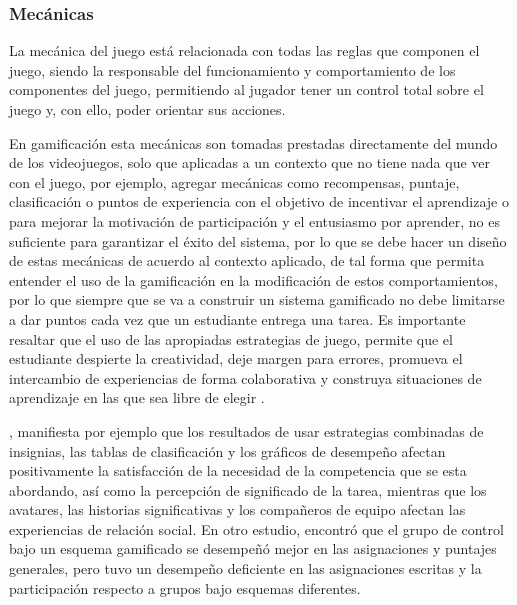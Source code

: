 \subsubsection{Mecánicas \label{sec:mecanicas}}

La mecánica del juego está relacionada con todas las reglas que componen el juego, siendo la responsable del
funcionamiento y comportamiento de los componentes del juego, permitiendo al jugador tener un control total 
sobre el juego y, con ello, poder orientar sus acciones.

En gamificación esta mecánicas son tomadas prestadas directamente del mundo de los videojuegos, solo que
aplicadas a un contexto que no tiene nada que ver con el juego, por ejemplo, agregar mecánicas como 
recompensas, puntaje, clasificación o puntos de experiencia con el objetivo de incentivar el aprendizaje o 
para mejorar la motivación de participación y el entusiasmo por aprender, no es suficiente para garantizar
el éxito del sistema, por lo que se debe hacer un diseño de estas mecánicas de acuerdo al contexto aplicado,
de tal forma que permita entender el uso de la gamificación en la modificación de estos comportamientos, por 
lo que siempre que se va a construir un sistema gamificado no debe limitarse a dar puntos cada vez que un
estudiante entrega una tarea. Es importante resaltar que el uso de las apropiadas estrategias de juego, 
permite que el estudiante despierte la creatividad, deje margen para errores, promueva el intercambio de 
experiencias de forma colaborativa y construya situaciones de aprendizaje en las que sea libre de elegir
\cite{DAROCHASEIXAS201648}.

, manifiesta por ejemplo que los resultados de usar estrategias combinadas de insignias, 
las tablas de clasificación y los gráficos de desempeño afectan positivamente la satisfacción de la necesidad
de la competencia que se esta abordando, así como la percepción de significado de la tarea, mientras que los 
avatares, las historias significativas y los compañeros de equipo afectan las experiencias de relación social. 
En otro estudio,  encontró que el grupo de control bajo un esquema gamificado se desempeñó 
mejor en las asignaciones y puntajes generales, pero tuvo un desempeño deficiente en las asignaciones escritas 
y la participación respecto a grupos bajo esquemas diferentes.

